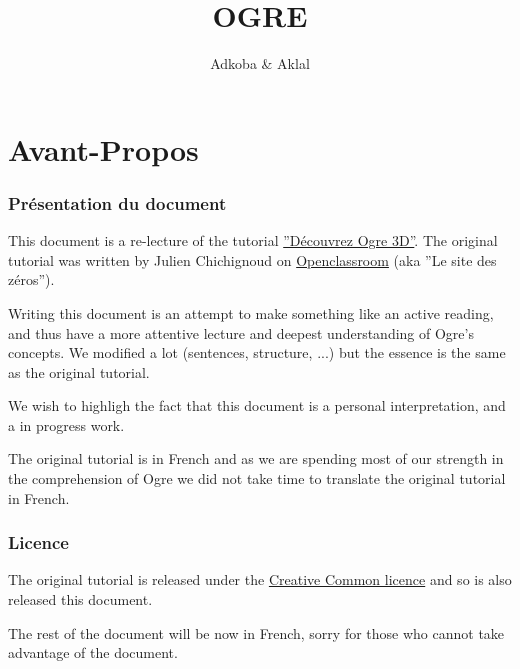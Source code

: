 \documentclass[10pt,a4paper]{book}
\title{OGRE}
\author{Adkoba \& Aklal}
\begin{document}
\maketitle
\newpage
\tableofcontents
\lstlistoflistings%
\newpage






\part*{Avant-Propos}
\section*{Pr\'esentation du document}
This document is a re-lecture of the tutorial \href{http://fr.openclassrooms.com/informatique/cours/decouvrez-ogre-3d}{''D\'ecouvrez Ogre 3D''}. The original tutorial was written by Julien Chichignoud on \href{fr.openclassrooms.com}{Openclassroom} (aka ''Le site des z\'eros'').\newline

Writing this document is an attempt to make something like an active reading, and thus have a more attentive lecture and deepest understanding of Ogre's concepts. We modified a lot (sentences, structure, ...) but the essence is the same as the original tutorial.\newline

We wish to highligh the fact that this document is a personal interpretation, and a in progress work.\newline

The original tutorial is in French and as we are spending most of our strength in the comprehension of Ogre we did not take time to translate the original tutorial in French.\newline


\section*{Licence}
The original tutorial is released under the 
\href{http://creativecommons.org/licenses/by-nc-sa/2.0/}{Creative Common licence} and so is also released this document.\newline

The rest of the document will be now in French, sorry for those who cannot take advantage of the document.
\end{document}

